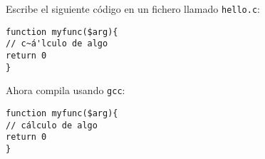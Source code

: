 \documentclass{article}
\begin{document}
\noindent
Escribe el siguiente código en un fichero llamado \texttt{hello.c}:

\begin{lstlisting}[style=C]
function myfunc($arg){
// c~á'lculo de algo
return 0
}
\end{lstlisting}

\noindent
Ahora compila usando \texttt{gcc}:


\begin{verbatim}
function myfunc($arg){
// cálculo de algo
return 0
}
\end{verbatim}
\end{document}
